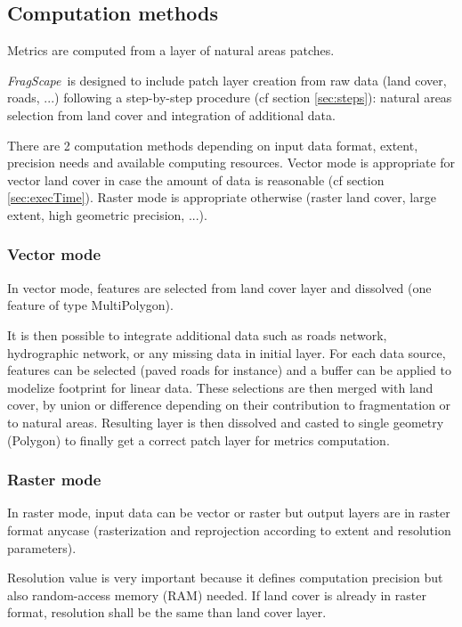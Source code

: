 \documentclass[11pt]{article}
\newcommand{\tool}{\emph{FragScape}}
\begin{document}
\bigskip

\subsection{Computation methods}
\label{sec:mode}

Metrics are computed from a layer of natural areas patches.

\tool\ is designed to include patch layer creation from raw data (land cover, roads, ...) following a step-by-step procedure (cf section \ref{sec:steps}): natural areas selection from land cover and integration of additional data.

There are 2 computation methods depending on input data format, extent, precision needs and available computing resources. Vector mode is appropriate for vector land cover in case the amount of data is reasonable (cf section \ref{sec:execTime}). Raster mode is appropriate otherwise (raster land cover, large extent, high geometric precision, ...). 

\subsubsection{Vector mode}

In vector mode, features are selected from land cover layer and dissolved (one feature of type MultiPolygon).

It is then possible to integrate additional data such as roads network, hydrographic network, or any missing data in initial layer. For each data source, features can be selected (paved roads for instance) and a buffer can be applied to modelize footprint for linear data. These selections are then merged with land cover, by union or difference depending on their contribution to fragmentation or to natural areas. Resulting layer is then dissolved and casted to single geometry (Polygon) to finally get a correct patch layer for metrics computation.

\subsubsection{Raster mode}

In raster mode, input data can be vector or raster but output layers are in raster format anycase (rasterization and reprojection according to extent and resolution parameters).

Resolution value is very important because it defines computation precision but also random-access memory (RAM) needed. If land cover is already in raster format, resolution shall be the same than land cover layer.
\end{document}
